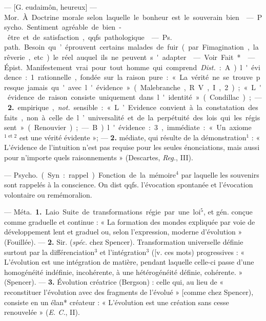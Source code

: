 \begin{itemize}[leftmargin=1cm, label=, itemsep=1pt]
 — [G. eudaimôn, heureux] — \si{Mor.} À Doctrine morale
selon laquelle le bonheur est le souverain bien.

 — \si{Psycho.} Sentiment
agréable de bien-être et de satisfaction, qqfs. pathologique.

 — \si{Ps. path.} Besoin qu’éprouvent certains malades de fuir (par
Fimagination, la rêverie, etc.) le
réel auquel ils ne peuvent s'adapter.

 — Voir Fait*.

 — \si{Épist.} Manifestement vrai pour tout homme qui
comprend. {\it Dist.} : A) l'évidence :
1. rationnelle, fondée sur la raison
pure : « La vérité ne se trouve
presque jamais qu'avec l'évidence »
(Malebranche, R. V., I, 2); « L'évidence de raison consiste uniquement dans l'identité » (Condillac) ; —
 {\bf 2.} empirique, {\it not.} sensible : « L’Evidence convient à la constatation des
faits, non à celle de l’universalité
et de la perpétuité des lois qui les
régissent » (Renouvier);

— B) l'évidence : 3, immédiate :
« Un axiome$^\text{1 et 2}$ est une vérité évidente »; — {\bf 2.} médiate, qui résulte de
la démonstration$^1$ : « L'évidence de
l'intuition n’est pas requise pour les
seules énonciations, mais aussi pour
n'importe quels raisonnements »
(Descartes, {\it Reg.}, III).

 — \si{Psycho.} (Syn. : rappel).
Fonction de la mémoire$^4$ par laquelle
les souvenirs sont rappelés à la conscience. On dist qqfs. l'évocation
spontanée et l’évocation volontaire
ou remémoralion.

 — \si{Méta.} {\bf 1.} Laio. Suite de
transformations régie par une loi$^5$,
et gén. conçue comme graduelle et
continue : « La formation des mondes
expliquée par voie de développement lent et graduel ou, selon
l'expression, moderne d'évolution »
(Fouillée). — {\bf 2.} Sir. ({\it spéc.} chez
Spencer). Transformation universelle définie surtout par la différenciation$^3$ et l'intégration$^3$ ([v. ces
mots) progressives : « L’évolution
est une intégration de matière, pendant laquelle celle-ci passe d’une
homogénéité indéfinie, incohérente,
à une hétérogénéité définie, cohérente. » (Spencer). — {\bf 3.} Évolution
créatrice (Bergson) : celle qui, au
lieu de « reconstituer l’évolution
avec des fragments de l’évolué »
[comme chez Spencer), consiste en
un élan* créateur : « L'évolution
est une création sans cesse renouvelée » ({\it E. C.}, II).


\end{itemize}
